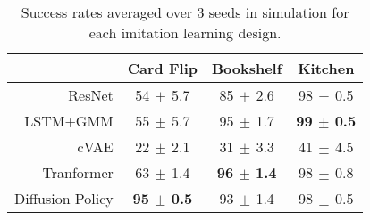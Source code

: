 \begin{table}[h]
    \centering
    \setlength\tabcolsep{12 pt}
    \begin{tabular}{r|ccc}
    \toprule
                        & Card Flip & Bookshelf & Kitchen \\
    \midrule
    ResNet \cite{he2016deep}                    & \small 54$\, \pm \,$5.7  & \small 85$\, \pm \,$2.6  & \small 98$\, \pm \,$0.5 \\ 
    LSTM+GMM \cite{robomimic2021}               & \small 55$\, \pm \,$5.7  & \small 95$\, \pm \,$1.7  & \small \textbf{99$\, \pm \,$0.5} \\ 
    cVAE \cite{kingma2013auto}                  & \small 22$\, \pm \,$2.1  & \small 31$\, \pm \,$3.3  & \small 41$\, \pm \,$4.5 \\ 
    Tranformer    \cite{vaswani2017attention}   & \small 63$\, \pm \,$1.4  & \small \textbf{96$\, \pm \,$1.4}  & \small 98$\, \pm \,$0.8 \\ 
    Diffusion Policy  \cite{chi2023diffusion}   & \small \textbf{95$\, \pm \,$0.5}   & \small 93$\, \pm \,$1.4  & \small 98$\, \pm \,$0.5 \\ 
    \bottomrule
    \end{tabular}
    \caption{Success rates averaged over 3 seeds in simulation for each imitation learning design.}
    \label{table:IL_arch_ablation}
\end{table}